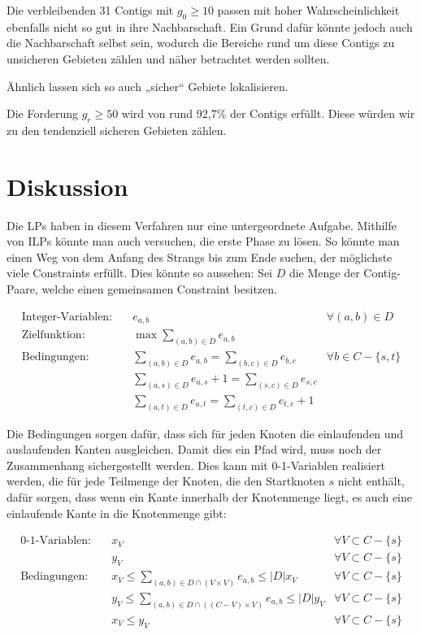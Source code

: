Die verbleibenden 31 Contigs mit $g_0 \geq 10$ passen mit hoher Wahrscheinlichkeit ebenfalls nicht so gut in ihre Nachbarschaft. Ein Grund dafür könnte jedoch auch die Nachbarschaft selbst sein, wodurch die Bereiche rund um diese Contigs zu unsicheren Gebieten zählen und näher betrachtet werden sollten.


Ähnlich lassen sich so auch „sicher“ Gebiete lokalisieren.

Die Forderung $g_r \geq 50$ wird von rund 92,7\% der Contigs erfüllt. Diese würden wir zu den tendenziell sicheren Gebieten zählen.
\chapter{Diskussion}
Die LPs haben in diesem Verfahren nur eine untergeordnete Aufgabe. Mithilfe von ILPs könnte man auch versuchen, die erste Phase zu lösen.
So könnte man einen Weg von dem Anfang des Strangs bis zum Ende suchen, der möglichste viele Constraints erfüllt. 
Dies könnte so aussehen: Sei $D$ die Menge der Contig-Paare, welche einen gemeinsamen Constraint besitzen.

\begin{align*}
\text{Integer-Variablen:}\quad& e_{a,b} &\forall (a,b) \in D\\
\text{Zielfunktion:}\quad& \max \sum_{(a,b) \in D} e_{a,b}\\
\text{Bedingungen:}\quad& \sum_{(a,b) \in D} e_{a,b} = \sum_{(b,c) \in D} e_{b,c} &\forall b \in C-\{s,t\}\\
& \sum_{(a,s) \in D} e_{a,s}+1 = \sum_{(s,c) \in D} e_{s,c}\\
& \sum_{(a,t) \in D} e_{a,t} = \sum_{(t,c) \in D} e_{t,c} +1
\end{align*}

Die Bedingungen sorgen dafür, dass sich für jeden Knoten die einlaufenden und auslaufenden Kanten ausgleichen. Damit dies ein Pfad wird, muss noch der Zusammenhang sichergestellt werden. Dies kann mit 0-1-Variablen realisiert werden, die für jede Teilmenge der Knoten, die den Startknoten $s$ nicht enthält, dafür sorgen, dass wenn ein Kante innerhalb der Knotenmenge liegt, es auch eine einlaufende Kante in die Knotenmenge gibt:

\begin{align*}
\text{0-1-Variablen:}\quad& x_V &\forall V \subset C-\{s\}\\
\quad& y_V &\forall V \subset C-\{s\}\\
\text{Bedingungen:}\quad&  x_V \leq \sum_{(a,b) \in D \cap (V \times V)}  e_{a,b} \leq |D| x_V  &\forall V \subset C-\{s\}\\
\quad&  y_V \leq \sum_{(a,b) \in D \cap ((C-V) \times V)}  e_{a,b} \leq |D| y_V  &\forall V \subset C-\{s\}\\
\quad&  x_V \leq y_V  &\forall V \subset C-\{s\}
\end{align*}

